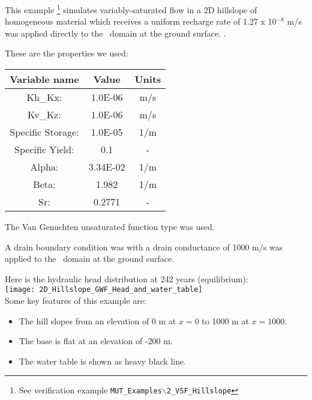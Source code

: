 \label{section:2d_hillslope_example}
This example \footnote{See verification example   \texttt{MUT\_Examples$\backslash$2\_VSF\_Hillslope}} simulates variably-saturated flow in a 2D hillslope of homogeneous material which receives a uniform recharge rate of 1.27 x 10$^{-8}$ m/s was applied directly to the \gwf\ domain at the ground surface. .

These are the properties we used:

\begin{tabular} {ccc} \hline
    Variable name           &    Value        & Units \\ \hline
	Kh\_Kx:             &     1.0E-06 & m/s \\
	Kv\_Kz:             &    1.0E-06   & m/s \\
	Specific Storage:  &    1.0E-05   & 1/m \\
	Specific Yield:    &    0.1       & - \\
	Alpha:             &    3.34E-02   & 1/m \\
	Beta:              &     1.982       & 1/m \\
	Sr:                &    0.2771       & - \\ \hline
\end{tabular}

The Van Genuchten unsaturated function type was used.

 

A drain boundary condition was with a drain conductance of 1000 m/s was applied to the \gwf\ domain at the ground surface.


Here is the hydraulic head distribution at 242 years (equilibrium):
    \vspace{.2in} \\
    \texttt{[image: 2D\_Hillslope\_GWF\_Head\_and\_water\_table]}
    \vspace{.2in} \\

Some key features of this example are:
\begin{itemize}
    \item The hill slopes from an elevation of 0 m at $x=0$ to 1000 m at $x=1000$.
    \item The base is flat at an elevation of -200 m.
  \item The water table is shown as heavy black line. 
\end{itemize}
